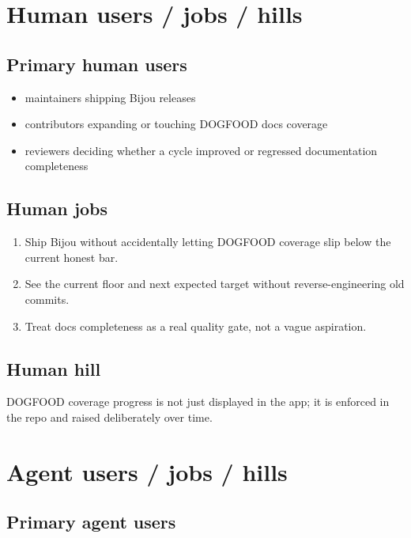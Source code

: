 \section{Human users / jobs / hills}\label{record-065-human-users-jobs-hills}

\subsection{Primary human users}\label{record-065-primary-human-users}

\begin{itemize}
\tightlist
\item
  maintainers shipping Bijou releases
\item
  contributors expanding or touching DOGFOOD docs coverage
\item
  reviewers deciding whether a cycle improved or regressed documentation completeness
\end{itemize}

\subsection{Human jobs}\label{record-065-human-jobs}

\begin{enumerate}
\def\labelenumi{\arabic{enumi}.}
\tightlist
\item
  Ship Bijou without accidentally letting DOGFOOD coverage slip below the current honest bar.
\item
  See the current floor and next expected target without reverse-engineering old commits.
\item
  Treat docs completeness as a real quality gate, not a vague aspiration.
\end{enumerate}

\subsection{Human hill}\label{record-065-human-hill}

DOGFOOD coverage progress is not just displayed in the app; it is enforced in the repo and raised deliberately over time.

\section{Agent users / jobs / hills}\label{record-065-agent-users-jobs-hills}

\subsection{Primary agent users}\label{record-065-primary-agent-users}

